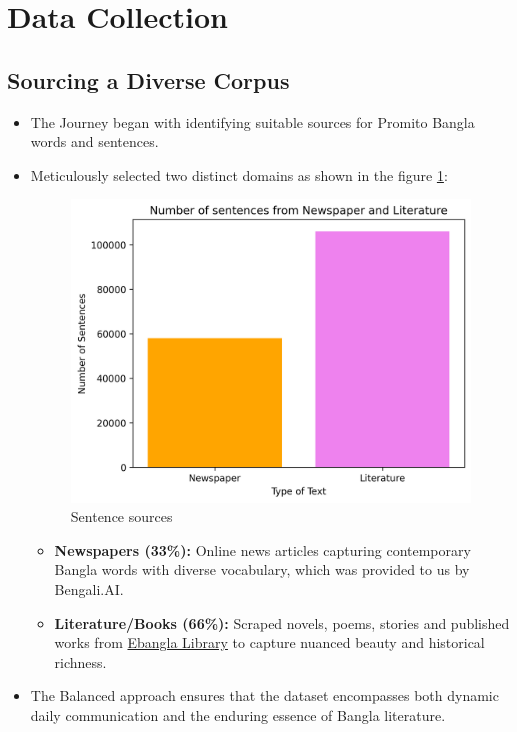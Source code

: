 \section{Data Collection}
\subsection{Sourcing a Diverse Corpus}
\begin{itemize}
    \item The Journey began with identifying suitable sources for Promito Bangla words and sentences.
    \item Meticulously selected two distinct domains as shown in the figure \ref{fig:Sentence sources}:

        \begin{figure}[h!]
            \centering
            \includegraphics[scale=1]{Images/Graph/output.png}
                \caption{Sentence sources}
            \label{fig:Sentence sources}
        \end{figure}

    
    \begin{itemize}
        \item \textbf{Newspapers (33\%):} Online news articles capturing contemporary Bangla words with diverse vocabulary, which was provided to us by Bengali.AI.
        \item \textbf{Literature/Books (66\%):} Scraped novels, poems, stories and published works from \href{https://www.ebanglalibrary.com/}{Ebangla Library}  to capture nuanced beauty and historical richness.
    \end{itemize}
    \item The Balanced approach ensures that the dataset encompasses both dynamic daily communication and the enduring essence of Bangla literature.
\end{itemize}


